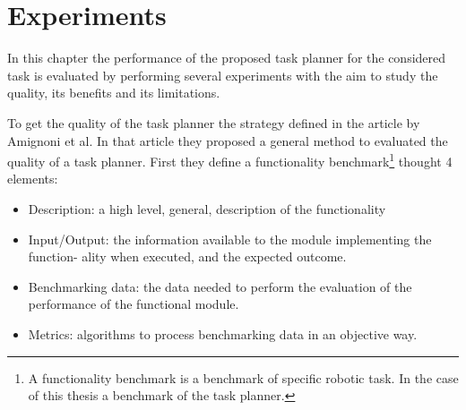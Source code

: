 \chapter{Experiments}
\label{ch:experiments}

In this chapter the performance of the proposed task planner for the considered task is evaluated by performing several experiments with the aim to study the quality, its benefits and its limitations.

To get the quality of the task planner the strategy defined in the article \citep{Benchmarking} by Amignoni et al. In that article they proposed a general method to evaluated the quality of a task planner. 
First they define a functionality benchmark\footnote{A functionality benchmark is a benchmark of specific robotic task. In the case of this thesis a benchmark of the task planner.} thought 4 elements:
\begin{itemize}
\item Description: a high level, general, description of the functionality
\item Input/Output: the information available to the module implementing the function-
ality when executed, and the expected outcome.
\item Benchmarking data: the data needed to perform the evaluation of the performance
of the functional module.
\item Metrics: algorithms to process benchmarking data in an objective way.
\end{itemize}

